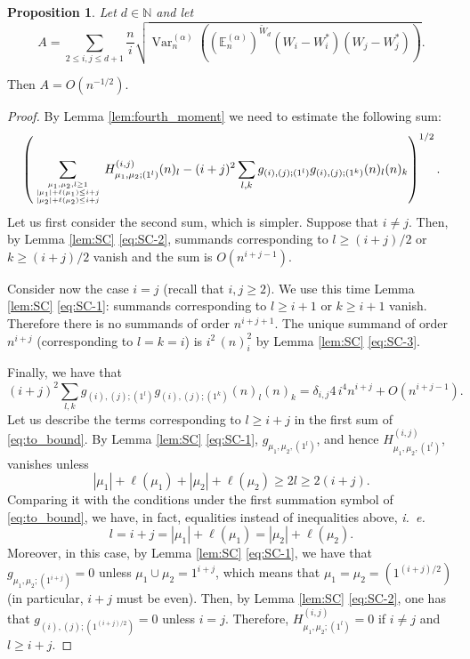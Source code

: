 \documentclass[11pt]{amsart}
\theoremstyle{plain}
\newtheorem{proposition}[lemma]{Proposition}
\theoremstyle{remark}
\newcommand{\N}{\mathbb{N}}
\newcommand{\esper}{\mathbb{E}}
\DeclareMathOperator{\Var}{Var}
\begin{document}
\begin{proposition}
\label{prop:ErrorTermA}
Let $d \in \N$ and let 
\[ A = \sum_{2 \leq i,j \leq d+1} \frac{n}{i} \sqrt{\Var_n^{(\alpha)}\left((\esper_n^{(\alpha)})^{\tilde{W}_d}(W_i - W_i^*)(W_j - W_j^*)\right)}.\]
\end{proposition}
Then $A = O(n^{-1/2})$.

\begin{proof}
By Lemma \ref{lem:fourth_moment} we need to estimate the following sum:
\begin{equation}\label{eq:to_bound}
    \left(
\sum_{\mu_1, \mu_2, l \ge 1 \atop 
{\tiny |\mu_1|+\ell(\mu_1) \le i+j \atop |\mu_2|+\ell(\mu_2) \le i+j} }
H^{(i,j)}_{\mu_1, \mu_2; (1^l)}(n)_l - (i+j)^2\sum_{l,k} g_{(i), (j); (1^l)}g_{(i), (j); (1^k)} (n)_l(n)_k \right)^{1/2}.
\end{equation}
Let us first consider the second sum, which is simpler.
Suppose that $i \neq j$.
Then, by Lemma \ref{lem:SC} \eqref{eq:SC-2},
summands corresponding to $l \ge (i+j)/2$ or $k \ge (i+j)/2$ vanish
and the sum is $O(n^{i+j-1})$.

Consider now the case $i=j$ (recall that $i,j \ge 2$).
We use this time Lemma \ref{lem:SC} \eqref{eq:SC-1}:
summands corresponding to $l \ge i+1$ or $k \ge i+1$ vanish.
Therefore there is no summands of order $n^{i+j+1}$.
The unique summand of order $n^{i+j}$ (corresponding to $l=k=i$) is
$i^2 \, (n)_i^2$ by Lemma \ref{lem:SC} \eqref{eq:SC-3}.

Finally, we have that
\begin{equation}\label{eq:estimate_sum_g2}
    (i+j)^2\sum_{l,k} g_{(i), (j); (1^l)}g_{(i), (j); (1^k)} (n)_l(n)_k =
\delta_{i,j} 4\, i^4 n^{i+j} + O(n^{i+j-1}).
\end{equation}
Let us describe the terms corresponding to $l \ge i+j$ 
in the first sum of \eqref{eq:to_bound}.
By Lemma \ref{lem:SC} \eqref{eq:SC-1},
$g_{\mu_1,\mu_2,(1^l)}$, and hence $H^{(i,j)}_{\mu_1,\mu_2,(1^l)}$, vanishes
unless
\[ |\mu_1|+\ell(\mu_1) + |\mu_2|+\ell(\mu_2) \ge 2l \ge 2(i+j).\]
Comparing it with the conditions under the first summation symbol of \eqref{eq:to_bound}, we have, in fact, equalities instead of inequalities above, {\em i.~e.}
\[ l = i+j = |\mu_1|+\ell(\mu_1) = |\mu_2|+\ell(\mu_2).\]
Moreover, in this case, by Lemma \ref{lem:SC} \eqref{eq:SC-1},
we have that $g_{\mu_1, \mu_2; (1^{i+j})} = 0$ unless $\mu_1 \cup \mu_2 = 1^{i+j}$, which means that
$\mu_1 = \mu_2 = (1^{(i+j)/2})$
(in particular, $i+j$ must be even).
Then, by Lemma \ref{lem:SC} \eqref{eq:SC-2},
one has that $g_{(i),(j);(1^{(i+j)/2})} = 0$ unless $i=j$.
Therefore, $H^{(i,j)}_{\mu_1, \mu_2; (1^l)}=0$ if $i \neq j$ and $l \ge i+j$.


\end{proof}
\end{document}

